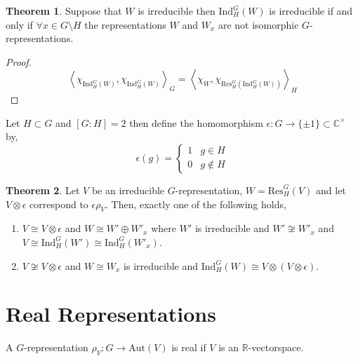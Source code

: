 \documentclass[12pt]{extarticle}
\newcommand{\C}{\mathbb{C}}
\newcommand{\R}{\mathbb{R}}
\newcommand{\aut}[1]{\mathrm{Aut}\left( #1 \right)}
\newcommand{\inner}[2]{\left<#1, #2 \right>}
\newcommand{\Ind}[3]{\mathrm{Ind}_{#2}^{#1}\left(#3\right)}
\newcommand{\Res}[3]{\mathrm{Res}_{#2}^{#1}\left(#3\right)}
\theoremstyle{definition}
\newtheorem{theorem}{Theorem}[section]
\newenvironment{definition}[1][Definition:]{\begin{trivlist}
\item[\hskip \labelsep {\bfseries #1}]}{\end{trivlist}}
\begin{document}
\begin{definition}

\end{definition}

\begin{theorem}
Suppose that $W$ is irreducible then $\Ind{G}{H}{W}$ is irreducible if and only if $\forall x \in G \setminus H$ the representations $W$ and $W_x$ are not isomorphic $G$-representations.
\end{theorem}

\begin{proof}
\[ \inner{\chi_{\Ind{G}{H}{W}}}{\chi_{\Ind{G}{H}{W}}}_G = \inner{\chi_W}{\chi_{\Res{G}{H}{\Ind{G}{H}{W}}}}_H \]

\end{proof}

\begin{definition}
Let $H \subset G$ and $[G : H] = 2$ then define the homomorphism $\epsilon : G \to \{\pm 1\} \subset \C^\times$ by,
\[ \epsilon(g) = 
\begin{cases}
1 & g \in H \\
0 & g \notin H
\end{cases}\]
\end{definition}

\begin{theorem}
Let $V$ be an irreducible $G$-representation, $W = \Res{G}{H}{V}$ and let $V \otimes \epsilon$ correspond to $\epsilon \rho_V$. Then, exactly one of the following holds,
\begin{enumerate}
\item $V \cong V \otimes \epsilon$ and $W \cong W' \oplus W'_x$ where $W'$ is irreducible and $W' \not\cong W'_x$ and $V \cong \Ind{G}{H}{W'} \cong \Ind{G}{H}{W'_x}$.

\item $V \not\cong V \otimes \epsilon$ and $W \cong W_x$ is irreducible and $\Ind{G}{H}{W} \cong V \otimes (V \otimes \epsilon)$.
\end{enumerate}
\end{theorem}

\section{Real Representations}

\begin{definition}
A $G$-representation $\rho_V : G \to \aut{V}$ is real if $V$ is an $\R$-vectorspace.
\end{definition}
\end{document}
